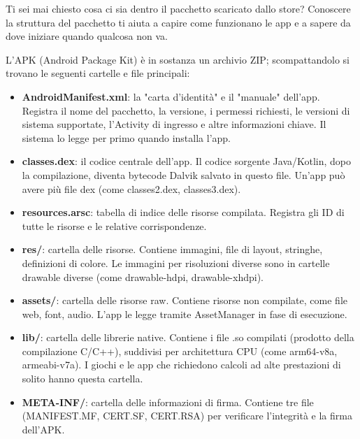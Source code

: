 
Ti sei mai chiesto cosa ci sia dentro il pacchetto scaricato dallo store? Conoscere la struttura del pacchetto ti aiuta a capire come funzionano le app e a sapere da dove iniziare quando qualcosa non va.


L'APK (Android Package Kit) è in sostanza un archivio ZIP; scompattandolo si trovano le seguenti cartelle e file principali:

\begin{itemize}
  \item \textbf{AndroidManifest.xml}: la "carta d'identità" e il "manuale" dell'app. Registra il nome del pacchetto, la versione, i permessi richiesti, le versioni di sistema supportate, l'Activity di ingresso e altre informazioni chiave. Il sistema lo legge per primo quando installa l'app.
  \item \textbf{classes.dex}: il codice centrale dell'app. Il codice sorgente Java/Kotlin, dopo la compilazione, diventa bytecode Dalvik salvato in questo file. Un'app può avere più file dex (come classes2.dex, classes3.dex).
  \item \textbf{resources.arsc}: tabella di indice delle risorse compilata. Registra gli ID di tutte le risorse e le relative corrispondenze.
  \item \textbf{res/}: cartella delle risorse. Contiene immagini, file di layout, stringhe, definizioni di colore. Le immagini per risoluzioni diverse sono in cartelle drawable diverse (come drawable-hdpi, drawable-xhdpi).
  \item \textbf{assets/}: cartella delle risorse raw. Contiene risorse non compilate, come file web, font, audio. L'app le legge tramite AssetManager in fase di esecuzione.
  \item \textbf{lib/}: cartella delle librerie native. Contiene i file .so compilati (prodotto della compilazione C/C++), suddivisi per architettura CPU (come arm64-v8a, armeabi-v7a). I giochi e le app che richiedono calcoli ad alte prestazioni di solito hanno questa cartella.
  \item \textbf{META-INF/}: cartella delle informazioni di firma. Contiene tre file (MANIFEST.MF, CERT.SF, CERT.RSA) per verificare l'integrità e la firma dell'APK.
\end{itemize}


